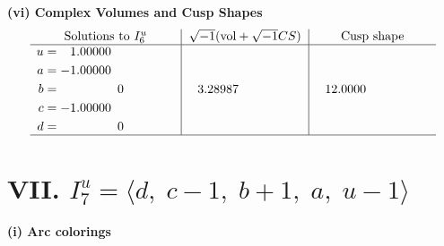 \documentclass[1p]{elsarticle_modified}
\theoremstyle{definition}
\newcommand{\I}{\sqrt{-1}}
\begin{document}
\newpage\flushleft \textbf{(vi) Complex Volumes and Cusp Shapes}
$$\begin{array}{c|c|c}  
\text{Solutions to }I^u_{6}& \I (\text{vol} + \sqrt{-1}CS) & \text{Cusp shape}\\
 \hline 
\begin{aligned}
u &= \phantom{-}1.00000\phantom{ +0.000000I} \\
a &= -1.00000\phantom{ +0.000000I} \\
b &= \phantom{-0.000000 } 0 \\
c &= -1.00000\phantom{ +0.000000I} \\
d &= \phantom{-0.000000 } 0\end{aligned}
 & \phantom{-}3.28987\phantom{ +0.000000I} & \phantom{-}12.0000\phantom{ +0.000000I}\\
 \hline 
 \end{array}$$\newpage\newpage\renewcommand{\arraystretch}{1}
\centering \section*{VII. $I^u_{7}= \langle d,\;c-1,\;b+1,\;a,\;u-1 \rangle$}
\flushleft \textbf{(i) Arc colorings}\\
\end{document}
